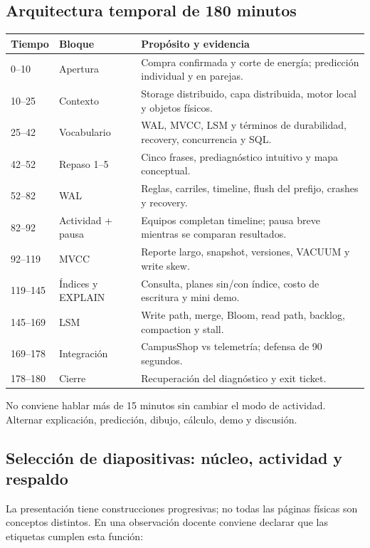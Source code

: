 \documentclass[variant=docente,cover=institutional,mode=screen]{ua-engineering-v6-article}
\begin{document}
\subsection{Arquitectura temporal de 180 minutos}

\begin{center}
\begin{tabular}{p{}p{}p{}}
\toprule
Tiempo & Bloque & Propósito y evidencia \\
\midrule
0--10 & Apertura & Compra confirmada y corte de energía; predicción individual y en parejas. \\
10--25 & Contexto & Storage distribuido, capa distribuida, motor local y objetos físicos. \\
25--42 & Vocabulario & WAL, MVCC, LSM y términos de durabilidad, recovery, concurrencia y SQL. \\
42--52 & Repaso 1--5 & Cinco frases, prediagnóstico intuitivo y mapa conceptual. \\
52--82 & WAL & Reglas, carriles, timeline, flush del prefijo, crashes y recovery. \\
82--92 & Actividad + pausa & Equipos completan timeline; pausa breve mientras se comparan resultados. \\
92--119 & MVCC & Reporte largo, snapshot, versiones, VACUUM y write skew. \\
119--145 & Índices y EXPLAIN & Consulta, planes sin/con índice, costo de escritura y mini demo. \\
145--169 & LSM & Write path, merge, Bloom, read path, backlog, compaction y stall. \\
169--178 & Integración & CampusShop vs telemetría; defensa de 90 segundos. \\
178--180 & Cierre & Recuperación del diagnóstico y exit ticket. \\
\bottomrule
\end{tabular}
\end{center}

No conviene hablar más de 15 minutos sin cambiar el modo de actividad. Alternar explicación, predicción, dibujo, cálculo, demo y discusión.

\subsection{Selección de diapositivas: núcleo, actividad y respaldo}

La presentación tiene construcciones progresivas; no todas las páginas físicas son conceptos distintos. En una observación docente conviene declarar que las etiquetas cumplen esta función:
\end{document}
